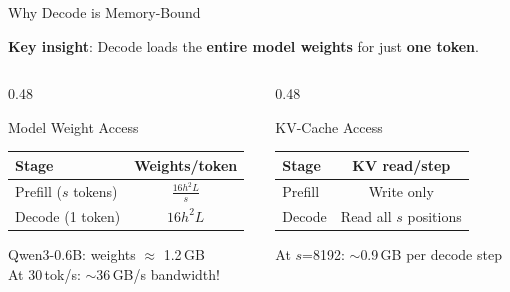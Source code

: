 \documentclass[aspectratio=169, 11pt]{beamer}
\begin{document}
\begin{frame}{Why Decode is Memory-Bound}

	\textbf{Key insight}: Decode loads the \textbf{entire model weights} for just \textbf{one token}.

	\begin{columns}[T]
		\begin{column}{0.48\textwidth}
			\begin{block}{Model Weight Access}
				\begin{tabular}{@{}lc@{}}
					\toprule
					\textbf{Stage}       & \textbf{Weights/token} \\
					\midrule
					Prefill ($s$ tokens) & $\frac{16h^2 L}{s}$    \\
					Decode (1 token)     & $16h^2 L$              \\
					\bottomrule
				\end{tabular}

				\vspace{0.3cm}
				Qwen3-0.6B: weights $\approx$ 1.2\,GB \\
				At 30\,tok/s: $\sim$36\,GB/s bandwidth!
			\end{block}
		\end{column}
		\begin{column}{0.48\textwidth}
			\begin{block}{KV-Cache Access}
				\begin{tabular}{@{}lc@{}}
					\toprule
					\textbf{Stage} & \textbf{KV read/step}  \\
					\midrule
					Prefill        & Write only             \\
					Decode         & Read all $s$ positions \\
					\bottomrule
				\end{tabular}

				\vspace{0.3cm}
				At $s$=8192: $\sim$0.9\,GB per decode step
			\end{block}
		\end{column}
	\end{columns}

\end{frame}
\end{document}
